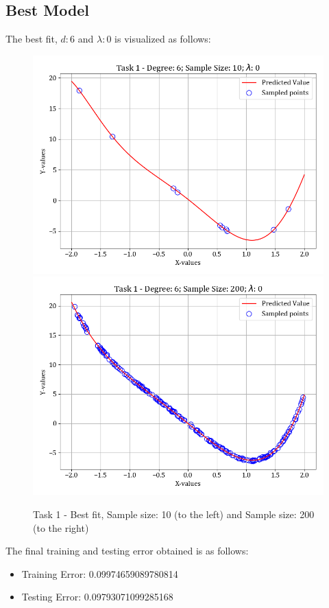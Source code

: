\documentclass[12pt,a4paper]{article}
\newcommand{\noi}{\noindent}
\begin{document}
\subsection{Best Model}
The best fit, $d:6$ and $\lambda:0$ is visualized as follows:
\begin{figure}[H]
    \hspace{-2em}
    \includegraphics[scale=0.45]{images/t1_d1/d_6_size_10_l_0.png}
    \includegraphics[scale=0.45]{images/t1_d1/d_6_size_200_l_0.png}
    \caption{Task 1 - Best fit, Sample size: 10 (to the left) and Sample size: 200 (to the right)}
\end{figure}

\noi
The final training and testing error obtained is as follows:
\begin{itemize}
    \itemsep0em
    \item Training Error: 0.09974659089780814
    \item Testing Error: 0.09793071099285168
\end{itemize}
\end{document}
